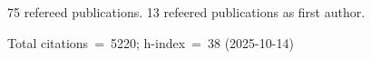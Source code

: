 75 refereed publications. 13 refeered publications as first author.

Total citations~=~5220; h-index~=~38 (2025-10-14)